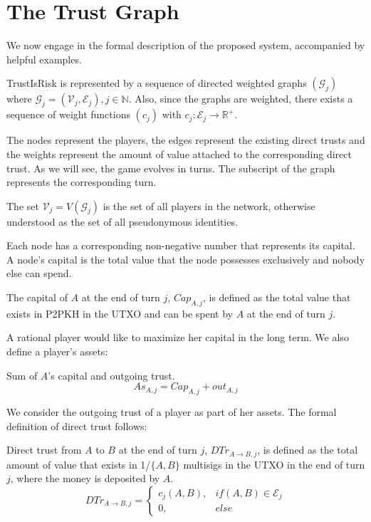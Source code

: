 \documentclass[11pt]{llncs}
\theoremstyle{definition}
\begin{document}
  \section{The Trust Graph}
     We now engage in the formal description of the proposed system, accompanied by helpful examples.
     \begin{definition}[Graph]
        TrustIsRisk is represented by a sequence of directed weighted graphs $\left(\mathcal{G}_j\right)$ where $\mathcal{G}_j
        = \left(\mathcal{V}_j, \mathcal{E}_j\right), j \in \mathbb{N}$.
        Also, since the graphs are weighted, there exists a sequence of weight functions $\left(c_j\right)$ with $c_j :
        \mathcal{E}_j \rightarrow \mathbb{R}^{+}$.
     \end{definition}
     The nodes represent the players, the edges represent the existing direct trusts and the weights represent the amount of
     value attached to the corresponding direct trust. As we will see, the game evolves in turns. The subscript of the graph
     represents the corresponding turn.
     \begin{definition}[Players]
        The set $\mathcal{V}_j = V\left(\mathcal{G}_j\right)$ is the set of all players in the network, otherwise understood
        as the set of all pseudonymous identities.
     \end{definition}
     Each node has a corresponding non-negative number that represents its capital. A node's capital is the total value that
     the node possesses exclusively and nobody else can spend.
     \begin{definition}[Capital]
        The capital of $A$ at the end of turn $j$, $Cap_{A, j}$, is defined as the total value that exists in P2PKH in the
        UTXO and can be spent by $A$ at the end of turn $j$.
     \end{definition}
     A rational player would like to maximize her capital in the long term. We also define a player's assets:
     \begin{definition}[Assets]
        Sum of $A$'s capital and outgoing trust.
        \begin{equation}
           As_{A, j} = Cap_{A, j} + out_{A, j}
        \end{equation}
     \end{definition}
     We consider the outgoing trust of a player as part of her assets. The formal definition of direct trust follows:
     \begin{definition}
        Direct trust from $A$ to $B$ at the end of turn $j$, $DTr_{A \rightarrow B, j}$, is defined as the total amount of
        value that exists in 1/$\{A,B\}$ multisigs in the UTXO in the end of turn $j$, where the money is deposited by $A$.
        \begin{equation}
           DTr_{A \rightarrow B, j} =
              \begin{cases}
                 c_j\left(A, B\right), & if \left(A, B\right) \in \mathcal{E}_j \\
                 0, & else
              \end{cases}
        \end{equation}
     \end{definition}
\end{document}
